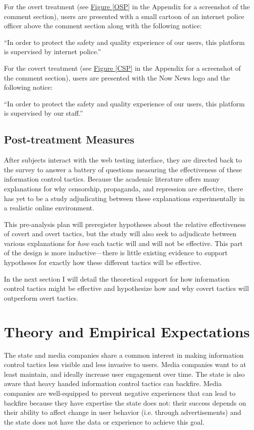 \documentclass[11pt]{article}
\begin{document}
For the overt treatment (see \hyperref[OSP]{Figure \ref*{OSP}} in the Appendix for a screenshot of the comment section), users are presented with a small cartoon of an internet police officer above the comment section along with the following notice:

``In order to protect the safety and quality experience of our users, this platform is supervised by internet police.''

For the covert treatment (see \hyperref[CSP]{Figure \ref*{CSP}} in the Appendix for a screenshot of the comment section), users are presented with the Now News logo and the following notice:

``In order to protect the safety and quality experience of our users, this platform is supervised by our staff.''

\subsection{Post-treatment Measures}

After subjects interact with the web testing interface, they are directed back to the survey to answer a battery of questions measuring the effectiveness of these information control tactics. Because the academic literature offers many explanations for why censorship, propaganda, and repression are effective, there has yet to be a study adjudicating between these explanations experimentally in a realistic online environment.

This pre-analysis plan will preregister hypotheses about the relative effectiveness of covert and overt tactics, but the study will also seek to adjudicate between various explanations for {\it how} each tactic will and will not be effective. This part of the design is more inductive---there is little existing evidence to support hypotheses for exactly how these different tactics will be effective.

In the next section I will detail the theoretical support for how information control tactics might be effective and hypothesize how and why covert tactics will outperform overt tactics.

\section{Theory and Empirical Expectations}

The state and media companies share a common interest in making information control tactics less visible and less invasive to users. Media companies want to at least maintain, and ideally increase user engagement over time. The state is also aware that heavy handed information control tactics can backfire. Media companies are well-equipped to prevent negative experiences that can lead to backfire because they have expertise the state does not: their success depends on their ability to affect change in user behavior (i.e. through advertisements) and the state does not have the data or experience to achieve this goal.
\end{document}
